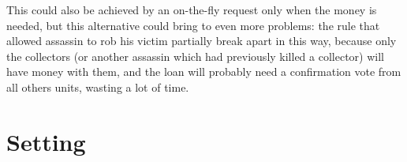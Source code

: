 				This could also be achieved by an on-the-fly request only when the money is needed, but this alternative could bring to even more problems: the rule that allowed assassin to rob his victim partially break apart in this way, because only the collectors (or another assassin which had previously killed a collector) will have money with them, and the loan will probably need a confirmation vote from all others units, wasting a lot of time.
	
	\section{Setting}
	
		